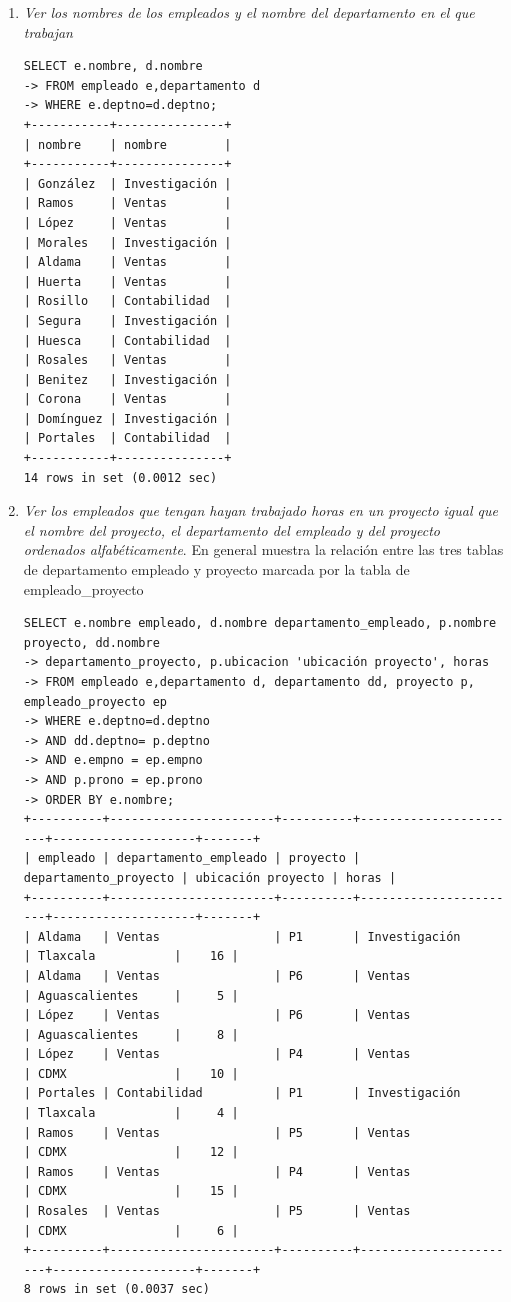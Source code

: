 \documentclass[titlepage,a4paper]{article}
\theoremstyle{definition}
\theoremstyle{remark}
\begin{document}
\begin{enumerate}
    \item \textit{Ver los nombres de los empleados y el nombre del departamento en el que trabajan}
    \begin{lstlisting}
SELECT e.nombre, d.nombre
-> FROM empleado e,departamento d
-> WHERE e.deptno=d.deptno;
+-----------+---------------+
| nombre    | nombre        |
+-----------+---------------+
| González  | Investigación |
| Ramos     | Ventas        |
| López     | Ventas        |
| Morales   | Investigación |
| Aldama    | Ventas        |
| Huerta    | Ventas        |
| Rosillo   | Contabilidad  |
| Segura    | Investigación |
| Huesca    | Contabilidad  |
| Rosales   | Ventas        |
| Benitez   | Investigación |
| Corona    | Ventas        |
| Domínguez | Investigación |
| Portales  | Contabilidad  |
+-----------+---------------+
14 rows in set (0.0012 sec)
    \end{lstlisting}


    \item \textit{Ver los empleados que tengan hayan trabajado horas en un proyecto igual que el nombre del proyecto, el departamento del empleado y del proyecto ordenados alfabéticamente}. En general muestra la relación entre las tres tablas de departamento empleado y proyecto marcada por la tabla de empleado\_proyecto
    \begin{lstlisting}
SELECT e.nombre empleado, d.nombre departamento_empleado, p.nombre proyecto, dd.nombre
-> departamento_proyecto, p.ubicacion 'ubicación proyecto', horas
-> FROM empleado e,departamento d, departamento dd, proyecto p, empleado_proyecto ep
-> WHERE e.deptno=d.deptno
-> AND dd.deptno= p.deptno
-> AND e.empno = ep.empno
-> AND p.prono = ep.prono
-> ORDER BY e.nombre;
+----------+-----------------------+----------+-----------------------+--------------------+-------+
| empleado | departamento_empleado | proyecto | departamento_proyecto | ubicación proyecto | horas |
+----------+-----------------------+----------+-----------------------+--------------------+-------+
| Aldama   | Ventas                | P1       | Investigación         | Tlaxcala           |    16 |
| Aldama   | Ventas                | P6       | Ventas                | Aguascalientes     |     5 |
| López    | Ventas                | P6       | Ventas                | Aguascalientes     |     8 |
| López    | Ventas                | P4       | Ventas                | CDMX               |    10 |
| Portales | Contabilidad          | P1       | Investigación         | Tlaxcala           |     4 |
| Ramos    | Ventas                | P5       | Ventas                | CDMX               |    12 |
| Ramos    | Ventas                | P4       | Ventas                | CDMX               |    15 |
| Rosales  | Ventas                | P5       | Ventas                | CDMX               |     6 |
+----------+-----------------------+----------+-----------------------+--------------------+-------+
8 rows in set (0.0037 sec)
    \end{lstlisting}
\end{enumerate}
\end{document}
